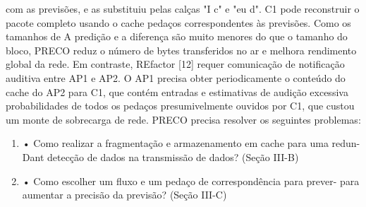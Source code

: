 \documentclass[12pt]{article}
\begin{document}
com as previsões, e as substituiu pelas calças "I c"
e "eu d". C1 pode reconstruir o pacote completo usando o cache
pedaços correspondentes às previsões. Como os tamanhos de
A predição e a diferença são muito menores do que o tamanho do bloco, PRECO
reduz o número de bytes transferidos no ar e melhora
rendimento global da rede. Em contraste, REfactor [12] requer
comunicação de notificação auditiva entre AP1 e
AP2. O AP1 precisa obter periodicamente o conteúdo do cache do AP2
para C1, que contém entradas e estimativas de audição excessiva
probabilidades de todos os pedaços presumivelmente ouvidos por C1, que
custou um monte de sobrecarga de rede.
PRECO precisa resolver os seguintes problemas:
\begin{enumerate}
	\item 
	• Como realizar a fragmentação e armazenamento em cache para uma redun-
	Dant detecção de dados na transmissão de dados? (Seção III-B)
		\item
	• Como escolher um fluxo e um pedaço de correspondência para prever-
	para aumentar a precisão da previsão? (Seção III-C)
\end{enumerate}




\end{document}
